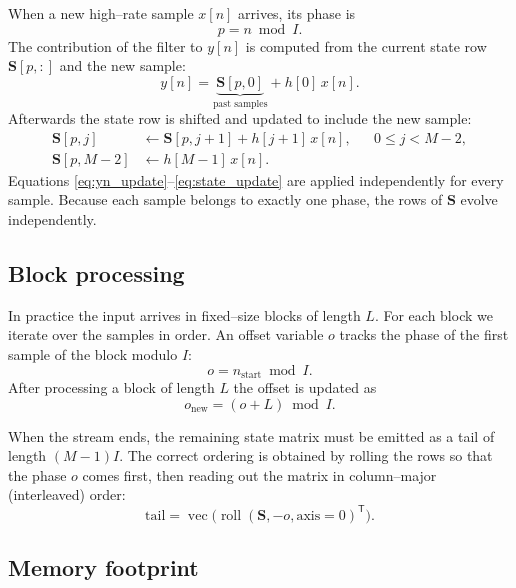 \documentclass[a4paper,11pt]{article}
\begin{document}
When a new high--rate sample $x[n]$ arrives, its phase is
\begin{equation}
    p = n \bmod I .
\end{equation}
The contribution of the filter to $y[n]$ is computed from the current state row $\mathbf{S}[p,:]$ and the new sample:
\begin{equation}
    y[n] = \underbrace{\mathbf{S}[p,0]}_{\text{past samples}}
    + h[0]\, x[n] .
    \label{eq:yn_update}
\end{equation}
Afterwards the state row is shifted and updated to include the new sample:
\begin{align}
    \mathbf{S}[p, j] &\leftarrow \mathbf{S}[p, j+1] + h[j+1]\, x[n],
    && 0 \le j < M-2, \\
    \mathbf{S}[p, M-2] &\leftarrow h[M-1]\, x[n] .
    \label{eq:state_update}
\end{align}
Equations \eqref{eq:yn_update}--\eqref{eq:state_update} are applied independently for every sample.  Because each sample belongs to exactly one phase, the rows of $\mathbf{S}$ evolve independently.

\subsection{Block processing}

In practice the input arrives in fixed--size blocks of length $L$.  For each block we iterate over the samples in order.  An offset variable $o$ tracks the phase of the first sample of the block modulo $I$:
\begin{equation}
    o = n_{\text{start}} \bmod I .
\end{equation}
After processing a block of length $L$ the offset is updated as
\begin{equation}
    o_{\text{new}} = (o + L) \bmod I .
\end{equation}

When the stream ends, the remaining state matrix must be emitted as a tail of length $(M-1)I$.  The correct ordering is obtained by rolling the rows so that the phase $o$ comes first, then reading out the matrix in column--major (interleaved) order:
\begin{equation}
    \text{tail} = \operatorname{vec}\bigl(\operatorname{roll}(\mathbf{S}, -o, \text{axis}=0)^{\mathsf{T}}\bigr) .
\end{equation}

\subsection{Memory footprint}
\end{document}
